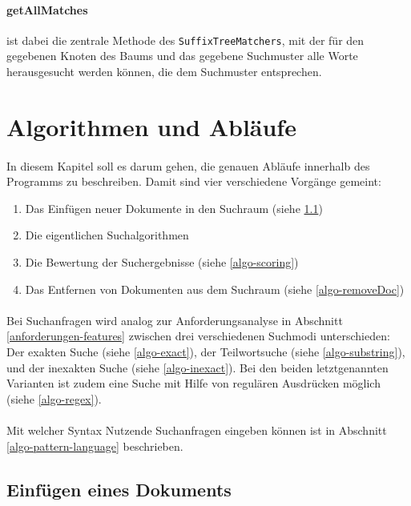 \paragraph{getAllMatches} ist dabei die zentrale Methode des \texttt{SuffixTreeMatchers}, mit der für den gegebenen Knoten des Baums und das gegebene Suchmuster alle Worte herausgesucht werden können, die dem Suchmuster entsprechen.

\newpage

\section{Algorithmen und Abläufe}
\label{impl-algorithms}

\paragraph{} In diesem Kapitel soll es darum gehen, die genauen Abläufe innerhalb des Programms zu beschreiben. Damit sind vier verschiedene Vorgänge gemeint:
\begin{enumerate}
 \item Das Einfügen neuer Dokumente in den Suchraum (siehe \ref{algo-addDoc})
 \item Die eigentlichen Suchalgorithmen
 \item Die Bewertung der Suchergebnisse (siehe \ref{algo-scoring})
 \item Das Entfernen von Dokumenten aus dem Suchraum (siehe \ref{algo-removeDoc})
\end{enumerate}

\paragraph{} Bei Suchanfragen wird analog zur Anforderungsanalyse in Abschnitt \ref{anforderungen-features} zwischen drei verschiedenen Suchmodi unterschieden: Der exakten Suche (siehe \ref{algo-exact}), der Teilwortsuche (siehe \ref{algo-substring}), und der inexakten Suche (siehe \ref{algo-inexact}). Bei den beiden letztgenannten Varianten ist zudem eine Suche mit Hilfe von regulären Ausdrücken möglich (siehe \ref{algo-regex}).
\paragraph{} Mit welcher Syntax Nutzende Suchanfragen eingeben können ist in Abschnitt \ref{algo-pattern-language} beschrieben.

\subsection{Einfügen eines Dokuments}
\label{algo-addDoc}

